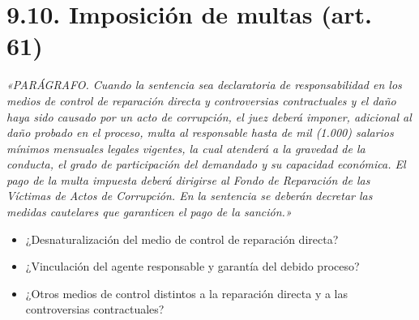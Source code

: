 \section{9.10. Imposición de multas (art. 61)}
\begin{cita}
\textit{«PARÁGRAFO. Cuando la sentencia sea declaratoria de responsabilidad en los medios de control de reparación directa y controversias contractuales y el daño haya sido causado por un acto de corrupción, el juez deberá imponer, adicional al daño probado en el proceso, multa al responsable hasta de mil (1.000) salarios mínimos mensuales legales vigentes, la cual atenderá a la gravedad de la conducta, el grado de participación del demandado y su capacidad económica. El pago de la multa impuesta deberá dirigirse al Fondo de Reparación de las Víctimas de Actos de Corrupción. En la sentencia se deberán decretar las medidas cautelares que garanticen el pago de la sanción.»}
\end{cita}
\begin{itemize}
\item ¿Desnaturalización del medio de control de reparación directa?
\item ¿Vinculación del agente responsable y garantía del debido proceso?
\item ¿Otros medios de control distintos a la reparación directa y a las controversias contractuales?
\end{itemize}

